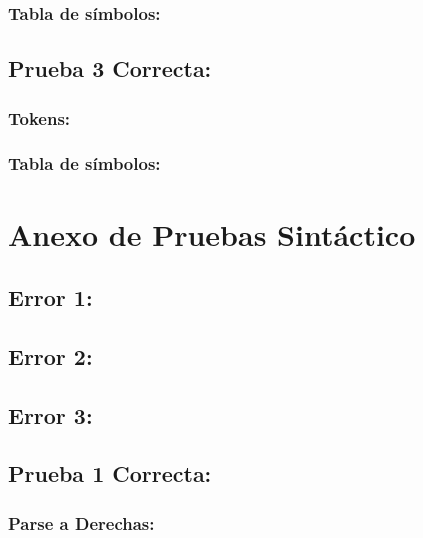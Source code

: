 \documentclass[a4paper, 12pt]{article}
\begin{document}
\subsubsection*{Tabla de símbolos:}


\subsection*{Prueba 3 Correcta:}

\subsubsection*{Tokens:}

\subsubsection*{Tabla de símbolos:}


\newpage
\section{Anexo de Pruebas Sintáctico}
\subsection*{Error 1:}



\subsection*{Error 2:}



\subsection*{Error 3:}



\subsection*{Prueba 1 Correcta:}

\subsubsection*{Parse a Derechas:}



\end{document}

